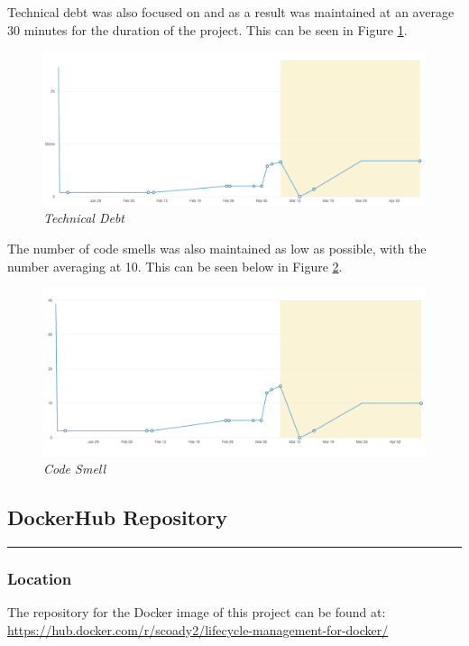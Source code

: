 Technical debt was also focused on and as a result was maintained at an average 30 minutes for the duration of the project. This can be seen in Figure \ref{fig:technical-debt}.
\clearpage
\begin{figure}[!ht]
\centering
\includegraphics*[width=\textwidth]{images/technical-debt}
\caption{\em Technical Debt}
\label{fig:technical-debt} 
\end{figure}

The number of \glspl{code smell} was also maintained as low as possible, with the number averaging at 10. This can be seen below in Figure \ref{fig:code_smell}.

\begin{figure}[!ht]
\centering
\includegraphics*[width=\textwidth]{images/code_smell}
\caption{\em Code Smell}
\label{fig:code_smell} 
\end{figure}

\clearpage

\subsection{DockerHub Repository} 
\label{appendix:dockerhub}
\rule{\textwidth}{0.4pt}

\subsubsection{Location}
The repository for the Docker image of this project can be found at: \url{https://hub.docker.com/r/scoady2/lifecycle-management-for-docker/}


